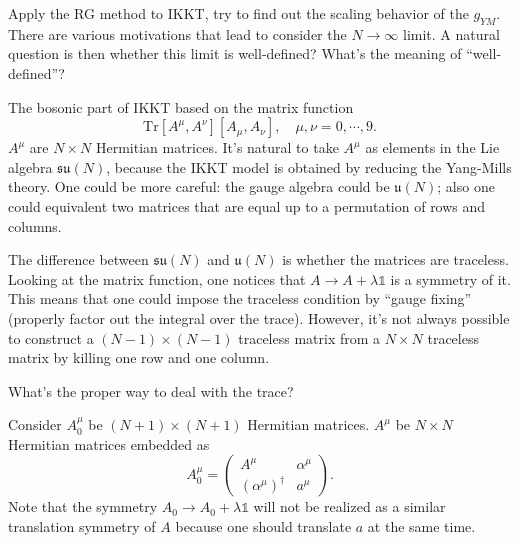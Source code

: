 \newpage

\begin{problem}[IKKT]
	Apply the RG method to IKKT,
	try to find out the scaling behavior of the $g_{YM}$.
	There are various motivations that lead to consider the $N\to\infty$ limit.
	A natural question is then whether this limit is well-defined?
	What's the meaning of ``well-defined''?
\end{problem}

The bosonic part of IKKT based on the matrix function
\[
	\mathrm{Tr}[A^\mu,A^\nu][A_\mu,A_\nu],\quad \mu,\nu=0,\cdots,9
.\] 
$A^\mu$ are $N\times N$ Hermitian matrices.
It's natural to take $A^\mu$ as elements in the Lie algebra
$\mathfrak{su}(N)$,
because the IKKT model is obtained by reducing the Yang-Mills theory.
One could be more careful:
the gauge algebra could be $\mathfrak{u}(N)$;
also one could equivalent two matrices that are equal up to a permutation of rows and columns.

The difference between
$\mathfrak{su}(N)$ and $\mathfrak{u}(N)$ is
whether the matrices are traceless.
Looking at the matrix function, one notices that
$A\to A + \lambda\mathds{1}$
is a symmetry of it.
This means that one could impose the traceless condition
by ``gauge fixing''
(properly factor out the integral over the trace).
However, it's not always possible to construct a $(N-1)\times(N-1)$ traceless matrix from a $N\times N$ traceless matrix by killing one row and one column.

\begin{question}
	What's the proper way to deal with the trace?
\end{question}

Consider $A_0^\mu$ be $(N+1)\times(N+1)$ Hermitian matrices.
$A^\mu$ be $N\times N$ Hermitian matrices embedded as
\[
	A_0^\mu = \begin{pmatrix} A^\mu & \alpha^\mu \\ (\alpha^\mu)^\dagger & a^\mu \end{pmatrix}
.\] 
Note that the symmetry $A_0 \to A_0 + \lambda \mathds{1}$ will
not be realized as a similar translation symmetry of $A$
because one should translate $a$ at the same time.

